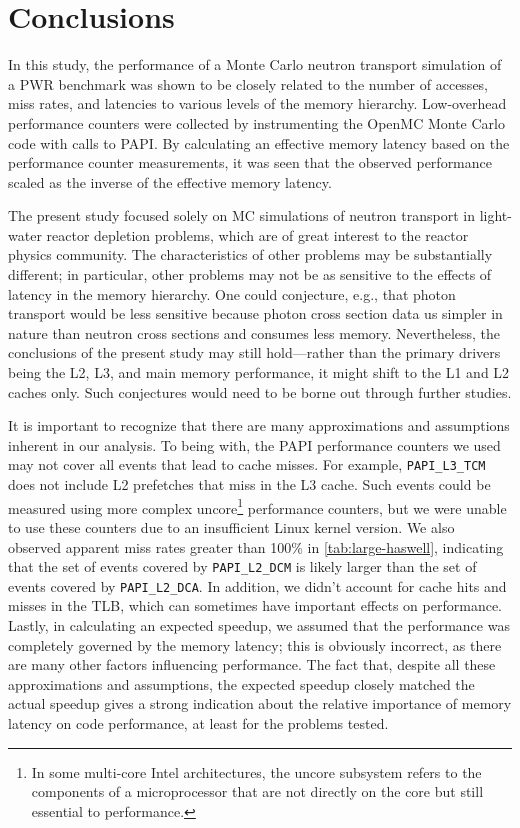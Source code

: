\documentclass{mc2015}
\begin{document}
\section{Conclusions}

In this study, the performance of a Monte Carlo neutron transport simulation of
a PWR benchmark was shown to be closely related to the number of accesses, miss
rates, and latencies to various levels of the memory hierarchy. Low-overhead
performance counters were collected by instrumenting the OpenMC Monte Carlo code
with calls to PAPI. By calculating an effective memory latency based on the
performance counter measurements, it was seen that the observed performance
scaled as the inverse of the effective memory latency.

The present study focused solely on MC simulations of neutron transport in
light-water reactor depletion problems, which are of great interest to the
reactor physics community. The characteristics of other problems may be
substantially different; in particular, other problems may not be as sensitive
to the effects of latency in the memory hierarchy. One could conjecture, e.g.,
that photon transport would be less sensitive because photon cross section data
us simpler in nature than neutron cross sections and consumes less
memory. Nevertheless, the conclusions of the present study may still
hold---rather than the primary drivers being the L2, L3, and main memory
performance, it might shift to the L1 and L2 caches only. Such conjectures would
need to be borne out through further studies.

It is important to recognize that there are many approximations and assumptions
inherent in our analysis. To being with, the PAPI performance counters we used
may not cover all events that lead to cache misses. For example,
\texttt{PAPI\_L3\_TCM} does not include L2 prefetches that miss in the L3
cache. Such events could be measured using more complex uncore\footnote{In some
  multi-core Intel architectures, the uncore subsystem refers to the components
  of a microprocessor that are not directly on the core but still essential to
  performance.} performance counters, but we were unable to use these counters
due to an insufficient Linux kernel version. We also observed apparent miss
rates greater than 100\% in \autoref{tab:large-haswell}, indicating that the set
of events covered by \texttt{PAPI\_L2\_DCM} is likely larger than the set of
events covered by \texttt{PAPI\_L2\_DCA}. In addition, we didn't account for
cache hits and misses in the TLB, which can sometimes have important effects on
performance. Lastly, in calculating an expected speedup, we assumed that the
performance was completely governed by the memory latency; this is obviously
incorrect, as there are many other factors influencing performance. The fact
that, despite all these approximations and assumptions, the expected speedup
closely matched the actual speedup gives a strong indication about the relative
importance of memory latency on code performance, at least for the problems
tested.
\end{document}
